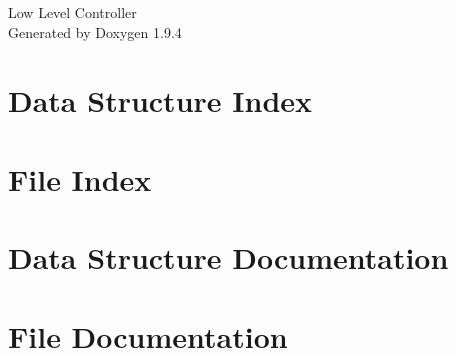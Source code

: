\documentclass[twoside]{book}
\newcommand{\+}{\discretionary{\mbox{\scriptsize$\hookleftarrow$}}{}{}}
\newcommand{\clearemptydoublepage}{%
    \newpage{\pagestyle{empty}\cleardoublepage}%
  }
\begin{document}
  \raggedbottom
    \hypersetup{pageanchor=false,
                bookmarksnumbered=true,
                pdfencoding=unicode
               }
  \begin{titlepage}
  \vspace*{7cm}
  \begin{center}%
  {\Large Low Level Controller}\\
  \vspace*{1cm}
  {\large Generated by Doxygen 1.9.4}\\
  \end{center}
  \end{titlepage}
  \clearemptydoublepage
  \tableofcontents
  \clearemptydoublepage
  \hypersetup{pageanchor=true}
\chapter{Data Structure Index}

\chapter{File Index}

\chapter{Data Structure Documentation}






















\chapter{File Documentation}





































  \backmatter
  \newpage
  \clearemptydoublepage
  \printindex
\end{document}
